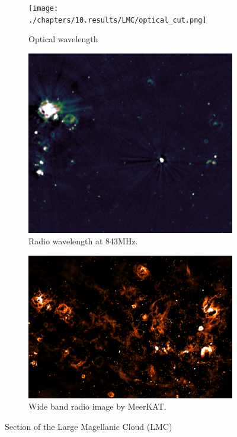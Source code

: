 \begin{figure}[h]
	\centering
	\begin{subfigure}[b]{0.3\linewidth}
		\texttt{[image: ./chapters/10.results/LMC/optical\_cut.png]}
		\caption{Optical wavelength}
	\end{subfigure}
	\begin{subfigure}[b]{0.30\linewidth}
		\includegraphics[width=1.0\linewidth]{./chapters/10.results/LMC/radio-843_cut.png}
		\caption{Radio wavelength at 843MHz.}
		\label{results:LMC:radio}
	\end{subfigure}
	\begin{subfigure}[b]{0.375\linewidth}
		\includegraphics[width=1.0\linewidth]{./chapters/10.results/LMC/meerkat2.png}
		\caption{Wide band radio image by MeerKAT.}
		\label{results:LMC:meerkat}
	\end{subfigure}
	\caption{Section of the Large Magellanic Cloud (LMC)}
	\label{results:LMC}
\end{figure}

